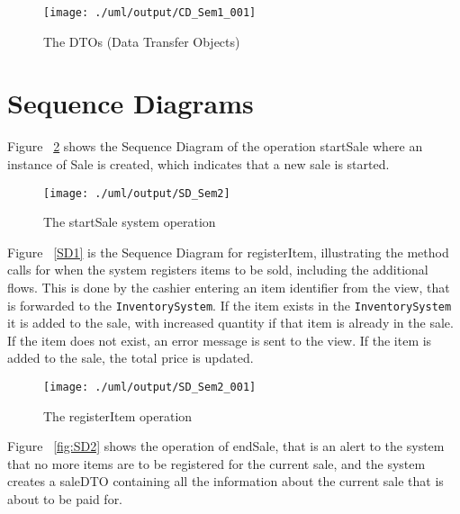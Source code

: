 \documentclass[a4paper]{scrreprt}
\begin{document}
    \begin{figure}[h!]
        \begin{center}
            \texttt{[image: ./uml/output/CD\_Sem1\_001]}
            \caption{The DTOs (Data Transfer Objects)}
            \label{fig:DTO}
        \end{center}
    \end{figure}

\newpage
\section{Sequence Diagrams}

Figure ~\ref{fig:SD} shows the Sequence Diagram of the operation startSale
where an instance of Sale is created, which indicates that a new sale is started.

\begin{figure}[h]
    \begin{center}
        \texttt{[image: ./uml/output/SD\_Sem2]}
        \caption{The startSale system operation }
        \label{fig:SD}
    \end{center}
\end{figure}
Figure ~\ref{SD1} is the Sequence Diagram for registerItem,
illustrating the method calls for when the system registers items to be sold,
including the additional flows.
This is done by the cashier entering an item identifier from the view,
that is forwarded to the \texttt{InventorySystem}.
If the item exists in the \texttt{InventorySystem} it is added to the sale,
with increased quantity if that item is already in the sale.
If the item does not exist, an error message is sent to the view.
If the item is added to the sale, the total price is updated.

\begin{figure}[h]
    \begin{center}
        \texttt{[image: ./uml/output/SD\_Sem2\_001]}
        \caption{The registerItem operation }
        \label{fig:SD1}
    \end{center}
\end{figure}

Figure ~\ref{fig:SD2} shows the operation of endSale,
that is an alert to the system that no more items are to be registered for the current sale,
and the system creates a saleDTO containing all the information about the current sale that is about to be paid for.
\end{document}
